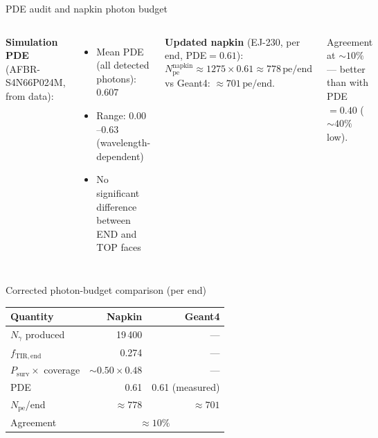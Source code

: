 \documentclass[aspectratio=169,9pt]{beamer}
\begin{document}
\begin{frame}{PDE audit and napkin photon budget}
\begin{columns}[T]
\textbf{Simulation PDE} (AFBR-S4N66P024M, from data):
\begin{itemize}
  \item Mean PDE (all detected photons): $0.607$
  \item Range: $0.00$--$0.63$ (wavelength-dependent)
  \item No significant difference between END and TOP faces
\end{itemize}

\textbf{Updated napkin} (EJ-230, per end, PDE$=0.61$):
\[
  N_{\mathrm{pe}}^{\mathrm{napkin}} \approx 1275 \times 0.61 \approx 778\,\mathrm{pe/end}
\]
vs Geant4: $\approx 701\,\mathrm{pe/end}$.

Agreement at $\sim\!10\%$ — better than with PDE$=0.40$ ($\sim\!40\%$ low).
\end{columns}

\vspace{8pt}
\begin{block}{Corrected photon-budget comparison (per end)}
\centering
\begin{tabular}{lrr}
\toprule
Quantity & Napkin & Geant4 \\
\midrule
$N_\gamma$ produced & 19\,400 & — \\
$f_{\mathrm{TIR,end}}$ & 0.274 & — \\
$P_{\mathrm{surv}} \times$ coverage & $\sim 0.50 \times 0.48$ & — \\
PDE & 0.61 & 0.61 (measured) \\
$N_{\mathrm{pe}}$/end & $\approx 778$ & $\approx 701$ \\
\midrule
Agreement & \multicolumn{2}{c}{$\approx\!10\%$} \\
\bottomrule
\end{tabular}
\end{block}
\end{frame}
\end{document}
